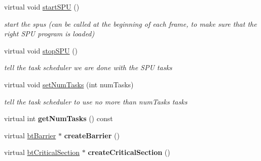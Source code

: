\begin{DoxyCompactItemize}
\mbox{\label{classSequentialThreadSupport_aae3626fe6fc67d14c0759712b3a0b5b2}} 
virtual void \hyperlink{classSequentialThreadSupport_aae3626fe6fc67d14c0759712b3a0b5b2}{start\+S\+PU} ()
\begin{DoxyCompactList}\small\item\em start the spus (can be called at the beginning of each frame, to make sure that the right S\+PU program is loaded) \end{DoxyCompactList}\item 
\mbox{\label{classSequentialThreadSupport_a306f9453238a2c97c0722be98d836e5b}} 
virtual void \hyperlink{classSequentialThreadSupport_a306f9453238a2c97c0722be98d836e5b}{stop\+S\+PU} ()
\begin{DoxyCompactList}\small\item\em tell the task scheduler we are done with the S\+PU tasks \end{DoxyCompactList}\item 
\mbox{\label{classSequentialThreadSupport_a9981028afebe39bdb99c1b224487ecb2}} 
virtual void \hyperlink{classSequentialThreadSupport_a9981028afebe39bdb99c1b224487ecb2}{set\+Num\+Tasks} (int num\+Tasks)
\begin{DoxyCompactList}\small\item\em tell the task scheduler to use no more than num\+Tasks tasks \end{DoxyCompactList}\item 
\mbox{\label{classSequentialThreadSupport_ac70d8efb2ae2a63382e221d2a102fdc4}} 
virtual int {\bfseries get\+Num\+Tasks} () const
\item 
\mbox{\label{classSequentialThreadSupport_a1ec0395df2739569d98f9828b62980f3}} 
virtual \hyperlink{classbtBarrier}{bt\+Barrier} $\ast$ {\bfseries create\+Barrier} ()
\item 
\mbox{\label{classSequentialThreadSupport_ab4ac7fe50f11250c1f0e9dc2fa81ca52}} 
virtual \hyperlink{classbtCriticalSection}{bt\+Critical\+Section} $\ast$ {\bfseries create\+Critical\+Section} ()
\item 
\mbox{\label{classSequentialThreadSupport_a745672b1af3b6df4ae91762767dda3f0}} 

\end{DoxyCompactItemize}
